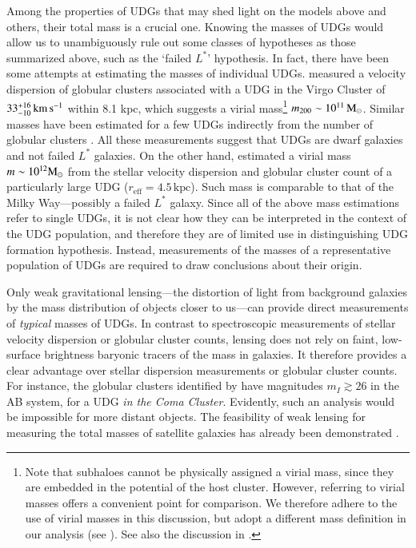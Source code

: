 \documentclass[usenatbib,fleqn]{mnras}
\def\reff{r_\mathrm{eff}}
\begin{document}
Among the properties of UDGs that may shed light on the models above and others, their total mass is a crucial one. Knowing the masses of UDGs would allow us to unambiguously rule out some classes of hypotheses as those summarized above, such as the `failed $L^*$' hypothesis. In fact, there have been some attempts at estimating the masses of individual UDGs. \cite{beasley16_virgo} measured a velocity dispersion of globular clusters associated with a UDG in the Virgo Cluster of $33_{-10}^{+16}\,\mathrm{km\,s^{-1}}$ within 8.1 kpc, which suggests a virial mass\footnote{Note that subhaloes cannot be physically assigned a virial mass, since they are embedded in the potential of the host cluster. However, referring to virial masses offers a convenient point for comparison. We therefore adhere to the use of virial masses in this discussion, but adopt a different mass definition in our analysis (see ). See also the discussion in \citet{sifon17}.} $m_{200}\sim10^{11}\,\mathrm{M}_\odot$. Similar masses have been estimated for a few UDGs indirectly from the number of globular clusters \citep{beasley16_acs,peng16}. All these measurements suggest that UDGs are dwarf galaxies and not failed $L^*$ galaxies. On the other hand, \cite{vandokkum16} estimated a virial mass $m\sim10^{12}\mathrm{M}_\odot$ from the stellar velocity dispersion and globular cluster count of a particularly large UDG ($\reff=4.5\,\mathrm{kpc}$). Such mass is comparable to that of the Milky Way---possibly a failed $L^*$ galaxy. Since all of the above mass estimations refer to single UDGs, it is not clear how they can be interpreted in the context of the UDG population, and therefore they are of limited use in distinguishing UDG formation hypothesis. Instead, measurements of the masses of a representative population of UDGs are required to draw conclusions about their origin.


Only weak gravitational lensing---the distortion of light from background galaxies by the mass distribution of objects closer to us---can provide direct measurements of \emph{typical} masses of UDGs. In contrast to spectroscopic measurements of stellar velocity dispersion or globular cluster counts, lensing does not rely on faint, low-surface brightness baryonic tracers of the mass in galaxies. It therefore provides a clear advantage over stellar dispersion measurements or globular cluster counts. For instance, the globular clusters identified by \cite{beasley16_acs} have magnitudes $m_I\gtrsim26$ in the AB system, for a UDG \emph{in the Coma Cluster}. Evidently, such an analysis would be impossible for more distant objects. The feasibility of weak lensing for measuring the total masses of satellite galaxies has already been demonstrated \citep[e.g.,][]{sifon15_kids,sifon17,li16}.  
\end{document}
